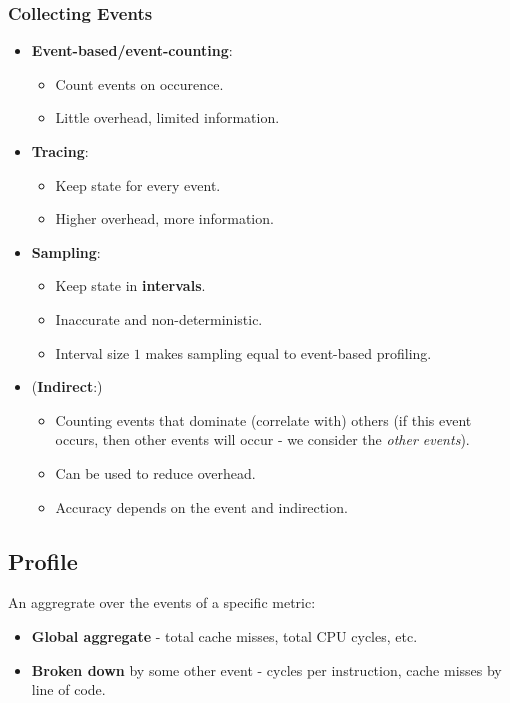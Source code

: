 \documentclass[11pt]{article}
\begin{document}
\subsubsection{Collecting Events}
\begin{itemize}
  \item \textbf{Event-based/event-counting}:
    \begin{itemize}
      \item Count events on occurence.
      \item Little overhead, limited information.
    \end{itemize}
  \item \textbf{Tracing}:
    \begin{itemize}
      \item Keep state for every event.
      \item Higher overhead, more information.
    \end{itemize}
  \item \textbf{Sampling}:
    \begin{itemize}
      \item Keep state in \textbf{intervals}.
      \item Inaccurate and non-deterministic.
      \item Interval size $1$ makes sampling equal to event-based profiling.
    \end{itemize}
  \item (\textbf{Indirect}:)
    \begin{itemize}
      \item Counting events that dominate (correlate with) others (if this event occurs, then other events will occur - we consider the \textit{other events}).
      \item Can be used to reduce overhead.
      \item Accuracy depends on the event and indirection.
    \end{itemize}
\end{itemize}

\subsection{Profile}
An aggregrate over the events of a specific metric:
\begin{itemize}
  \item \textbf{Global aggregate} - total cache misses, total CPU cycles, etc.
  \item \textbf{Broken down} by some other event - cycles per instruction, cache misses by line of code.
\end{itemize}
\end{document}
